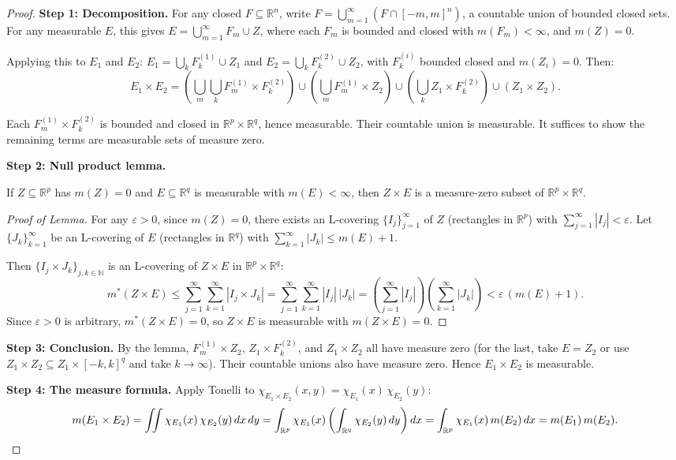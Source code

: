 \documentclass[11pt]{report}
\begin{document}
\begin{proof}
\textbf{Step 1: Decomposition.} For any closed $F \subseteq \mathbb{R}^n$, write $F = \bigcup_{m=1}^{\infty} (F \cap [-m, m]^n)$, a countable union of bounded closed sets. For any measurable $E$, this gives $E = \bigcup_{m=1}^{\infty} F_m \cup Z$, where each $F_m$ is bounded and closed with $m(F_m) < \infty$, and $m(Z) = 0$.

Applying this to $E_1$ and $E_2$: $E_1 = \bigcup_k F_k^{(1)} \cup Z_1$ and $E_2 = \bigcup_k F_k^{(2)} \cup Z_2$, with $F_k^{(i)}$ bounded closed and $m(Z_i) = 0$. Then:
\[
E_1 \times E_2 = \left(\bigcup_m \bigcup_k F_m^{(1)} \times F_k^{(2)}\right) \cup \left(\bigcup_m F_m^{(1)} \times Z_2\right) \cup \left(\bigcup_k Z_1 \times F_k^{(2)}\right) \cup (Z_1 \times Z_2).
\]

Each $F_m^{(1)} \times F_k^{(2)}$ is bounded and closed in $\mathbb{R}^p \times \mathbb{R}^q$, hence measurable. Their countable union is measurable. It suffices to show the remaining terms are measurable sets of measure zero.

\textbf{Step 2: Null product lemma.}

\begin{lembox}
If $Z \subseteq \mathbb{R}^p$ has $m(Z) = 0$ and $E \subseteq \mathbb{R}^q$ is measurable with $m(E) < \infty$, then $Z \times E$ is a measure-zero subset of $\mathbb{R}^p \times \mathbb{R}^q$.
\end{lembox}

\begin{proof}[Proof of Lemma]
For any $\varepsilon > 0$, since $m(Z) = 0$, there exists an L-covering $\{I_j\}_{j=1}^{\infty}$ of $Z$ (rectangles in $\mathbb{R}^p$) with $\sum_{j=1}^{\infty} |I_j| < \varepsilon$. Let $\{J_k\}_{k=1}^{\infty}$ be an L-covering of $E$ (rectangles in $\mathbb{R}^q$) with $\sum_{k=1}^{\infty} |J_k| \leq m(E) + 1$.

Then $\{I_j \times J_k\}_{j,k \in \mathbb{N}}$ is an L-covering of $Z \times E$ in $\mathbb{R}^p \times \mathbb{R}^q$:
\[
m^*(Z \times E) \leq \sum_{j=1}^{\infty} \sum_{k=1}^{\infty} |I_j \times J_k| = \sum_{j=1}^{\infty} \sum_{k=1}^{\infty} |I_j|\,|J_k| = \left(\sum_{j=1}^{\infty} |I_j|\right)\!\left(\sum_{k=1}^{\infty} |J_k|\right) < \varepsilon\,(m(E) + 1).
\]
Since $\varepsilon > 0$ is arbitrary, $m^*(Z \times E) = 0$, so $Z \times E$ is measurable with $m(Z \times E) = 0$.
\end{proof}

\textbf{Step 3: Conclusion.} By the lemma, $F_m^{(1)} \times Z_2$, $Z_1 \times F_k^{(2)}$, and $Z_1 \times Z_2$ all have measure zero (for the last, take $E = Z_2$ or use $Z_1 \times Z_2 \subseteq Z_1 \times [-k,k]^q$ and take $k \to \infty$). Their countable unions also have measure zero. Hence $E_1 \times E_2$ is measurable.

\textbf{Step 4: The measure formula.} Apply Tonelli to $\chi_{E_1 \times E_2}(x, y) = \chi_{E_1}(x)\,\chi_{E_2}(y)$:
\[
m(E_1 \times E_2) = \iint \chi_{E_1}(x)\,\chi_{E_2}(y)\,dx\,dy = \int_{\mathbb{R}^p} \chi_{E_1}(x) \left(\int_{\mathbb{R}^q} \chi_{E_2}(y)\,dy\right) dx = \int_{\mathbb{R}^p} \chi_{E_1}(x)\,m(E_2)\,dx = m(E_1)\,m(E_2). \qedhere
\]
\end{proof}
\end{document}
